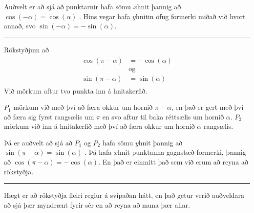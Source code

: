 \documentclass[a4paper,10pt,icelandic]{sphinxmanual}
\begin{document}
Auðvelt er að sjá að punktarnir hafa sömu \(x\)\sphinxhyphen{}hnit þannig að \(\cos(-\alpha)=\cos(\alpha)\) .
Hins vegar hafa \(y\)\sphinxhyphen{}hnitin öfug formerki miðað við hvort annað, svo \(\sin(-\alpha)=-\sin(\alpha)\).


\bigskip\hrule\bigskip


 Rökstyðjum að
\begin{equation*}
\begin{split}\begin{aligned}
\cos(\pi-\alpha)&=-\cos(\alpha) \\
&\text{og} \\
\sin(\pi-\alpha)&=\sin(\alpha)
\end{aligned}\end{split}
\end{equation*}
Við mörkum aftur tvo punkta inn á hnitakerfið.

\(P_1\) mörkum við með því að færa okkur um hornið \(\pi-\alpha\), en það er gert með því að færa sig fyrst rangsælis um \(\pi\) en svo aftur til baka réttsælis um hornið \(\alpha\).
\(P_2\) mörkum við inn á hnitakerfið með því að færa okkur um hornið \(\alpha\) rangsælis.


Þá er auðvelt að sjá að \(P_1\) og \(P_2\) hafa sömu \(y\)\sphinxhyphen{}hnit þannig að \(\sin(\pi-\alpha)=\sin(\alpha)\) .
Þá hafa \(x\)\sphinxhyphen{}hnit punktanna gagnstæð formerki, þannig að \(\cos(\pi-\alpha)=-\cos(\alpha)\). En það er einmitt það sem við erum að reyna að rökstyðja.


\bigskip\hrule\bigskip


Hægt er að rökstyðja fleiri reglur á svipaðan hátt, en það getur verið auðveldara að sjá þær myndrænt fyrir sér en að reyna að muna þær allar.
\end{document}
